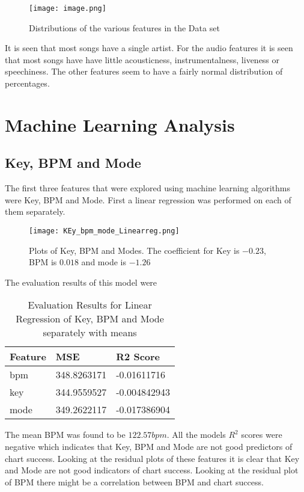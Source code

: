 \documentclass[titlepage]{article}
\begin{document}
\begin{figure}[H]
    \centering
    \texttt{[image: image.png]}
    \caption{Distributions of the various features in the Data set}
    \label{fig:enter-label}
\end{figure} 

It is seen that most songs have a single artist. For the audio features it is seen that most songs have have little acousticness, instrumentalness, liveness or speechiness. The other features seem to have a fairly normal distribution  of percentages. 

\section*{Machine Learning Analysis} 
\subsection*{Key, BPM and Mode} 
The first three features that were explored using machine learning algorithms were Key, BPM and Mode. First a linear regression was performed on each of them separately.  

\begin{figure}[H]
    \centering
    \texttt{[image: KEy\_bpm\_mode\_Linearreg.png]}
    \caption{Plots of Key, BPM and Modes. The coefficient for Key is $-0.23$, BPM is $0.018$ and mode is $-1.26$}
    \label{fig:enter-label} 
\end{figure}
\noindent The evaluation results of this model were 
\begin{table}[H]
    \centering
    \caption{Evaluation Results for Linear Regression of Key, BPM and Mode separately with means}
    \begin{tabular}{lll}
    \hline
        Feature & MSE & R2 Score  \\ \hline
        bpm & 348.8263171 & -0.01611716  \\ 
        key & 344.9559527 & -0.004842943 \\ 
        mode & 349.2622117 & -0.017386904 \\ \hline
    \end{tabular}
\end{table} 
\noindent The mean BPM was found to be $122.57 bpm$. All the models $R^2$ scores were negative which indicates that Key, BPM and Mode are not good predictors of chart success. Looking at the residual plots of these features it is clear that Key and Mode are not good indicators of chart success. Looking at the residual plot of BPM there might be a correlation between BPM and chart success. 
\end{document}
